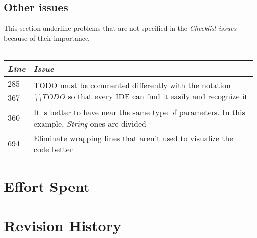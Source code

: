 \documentclass[11pt,a4paper]{report}
\begin{document}
\section{Other issues}
This section underline problems that are not specified in the \textit{Checklist issues} because of their importance.\\\\
\begin{tabularx}{\textwidth}{|l|X|}
	\hline
	\textit{Line} & \textit{Issue}\\
	\hline
	285 & \multirow{2}{*}{TODO must be commented differently with the notation \textit{\textbackslash\textbackslash TODO} so that every IDE can find it easily and recognize it}\\
	367 & \\
	\hline
	360 & It is better to have near the same type of parameters. In this example, \textit{String} ones are divided\\
	\hline
	694 & Eliminate wrapping lines that aren't used to visualize the code better\\
	\hline
\end{tabularx}
\chapter{Effort Spent}
\chapter{Revision History}
\end{document}

